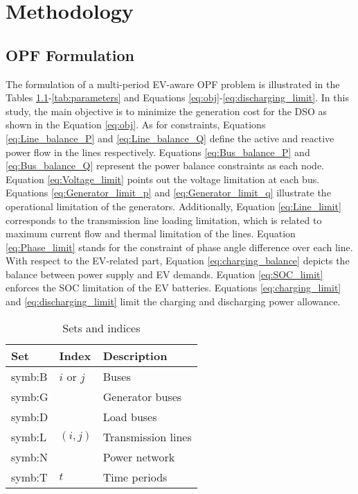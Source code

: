 \chapter{Methodology}\label{chapter:Methodology}
\section{OPF Formulation}\label{sec:OPF_form}
The formulation of a multi-period \gls{EV}-aware \gls{OPF} problem is illustrated in the Tables \ref{tab:sets and indices}-\ref{tab:parameters} and Equations \ref{eq:obj}-\ref{eq:discharging_limit}. In this study, the main objective is to minimize the generation cost for the \gls{DSO} as shown in the Equation \ref{eq:obj}. As for constraints, Equations \ref{eq:Line_balance_P} and \ref{eq:Line_balance_Q} define the active and reactive power flow in the lines respectively. Equations \ref{eq:Bus_balance_P} and \ref{eq:Bus_balance_Q} represent the power balance constraints as each node. Equation \ref{eq:Voltage_limit} points out the voltage limitation at each bus. Equations \ref{eq:Generator_limit_p} and \ref{eq:Generator_limit_q} illustrate the operational limitation of the generators. Additionally, Equation \ref{eq:Line_limit} corresponds to the transmission line loading limitation, which is related to maximum current flow and thermal limitation of the lines. Equation \ref{eq:Phase_limit} stands for the constraint of phase angle difference over each line. With respect to the \gls{EV}-related part, Equation \ref{eq:charging_balance} depicts the balance between power supply and \gls{EV} demands. Equation \ref{eq:SOC_limit} enforces the \gls{SOC} limitation of the \gls{EV} batteries. Equations \ref{eq:charging_limit} and \ref{eq:discharging_limit} limit the charging and discharging power allowance.
\begin{table}[h]
\centering
\begin{tabular}{p{4cm} p{3cm} p{4cm}}
\toprule
Set & Index & Description \\
\midrule
\gls{symb:B} & $i$ or $j$ & Buses\\[0.5em]
\gls{symb:G} &  & Generator buses \\[0.5em]
\gls{symb:D} &  & Load buses \\[0.5em]
\gls{symb:L} & $(i,j)$ & Transmission lines \\[0.5em]
\gls{symb:N} &  & Power network\\[0.5em]
\gls{symb:T} & $t$ & Time periods \\[0.5em]
\bottomrule
\end{tabular}
\caption{Sets and indices}\label{tab:sets and indices}
\end{table}

